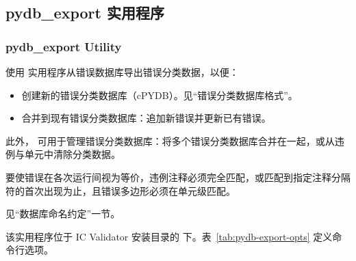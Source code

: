 \subsection{pydb\_export 实用程序}
\subsubsection*{pydb\_export Utility}

使用  实用程序从错误数据库导出错误分类数据，以便：
\begin{itemize}
  \item 创建新的错误分类数据库（cPYDB）。见``错误分类数据库格式''。
  \item 合并到现有错误分类数据库：追加新错误并更新已有错误。
\end{itemize}

此外， 可用于管理错误分类数据库：将多个错误分类数据库合并在一起，或从违例与单元中清除分类数据。

要使错误在各次运行间视为等价，违例注释必须完全匹配，或匹配到指定注释分隔符的首次出现为止，且错误多边形必须在单元级匹配。

\begin{noteBox}
见``数据库命名约定''一节。
\end{noteBox}

该实用程序位于 IC Validator 安装目录的  下。表~\ref{tab:pydb-export-opts} 定义命令行选项。

